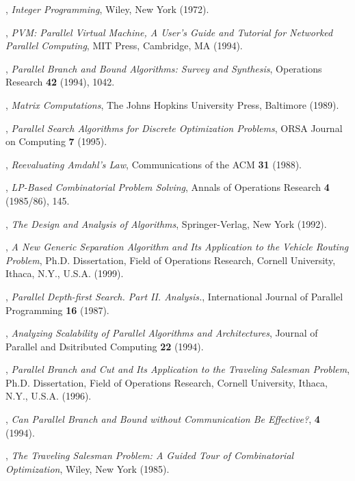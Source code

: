 \begin{thebibliography}{9}
,
{\em Integer Programming},
Wiley, New York (1972).

,
{\em PVM: Parallel Virtual Machine, A User's Guide and Tutorial for
Networked Parallel Computing},
MIT Press, Cambridge, MA (1994).

,
{\em Parallel Branch and Bound Algorithms: Survey and Synthesis},
Operations Research {\bf 42} (1994), 1042. 

,
{\em Matrix Computations},
The Johns Hopkins University Press, Baltimore (1989).

, {\em Parallel Search
Algorithms for Discrete Optimization Problems}, ORSA Journal on
Computing {\bf 7} (1995).

,
{\em Reevaluating Amdahl's Law}, Communications of the ACM {\bf 31} (1988).

, 
{\em LP-Based Combinatorial Problem Solving},
Annals of Operations Research {\bf 4} (1985/86), 145.

,
{\em The Design and Analysis of Algorithms},
Springer-Verlag, New York (1992).

,
{\em A New Generic Separation Algorithm and Its Application to the
Vehicle Routing Problem},
Ph.D. Dissertation, Field of Operations Research,
Cornell University, Ithaca, N.Y., U.S.A. (1999).

, {\em Parallel Depth-first
Search. Part II. Analysis.}, International Journal of Parallel
Programming {\bf 16} (1987).

, {\em Analyzing Scalability
of Parallel Algorithms and Architectures}, Journal of Parallel and
Dsitributed Computing {\bf 22} (1994).

,
{\em Parallel Branch and Cut and Its Application to the
       Traveling Salesman Problem},
Ph.D. Dissertation, Field of Operations Research,
Cornell University, Ithaca, N.Y., U.S.A. (1996).

, {\em Can Parallel Branch and Bound
without Communication Be Effective?}, {\bf 4} (1994).

,
{\em The Traveling Salesman Problem: A Guided
Tour of Combinatorial Optimization},
Wiley, New York (1985).


\end{thebibliography}
